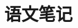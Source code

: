 ﻿\renewcommand{\hatabstractname}{\nob}




\title{语文笔记}
\author{\noe}
\date{\nof}


\maketitle
\begin{hatabstract}
\noc
\end{hatabstract}\label{abstractformal}





 
